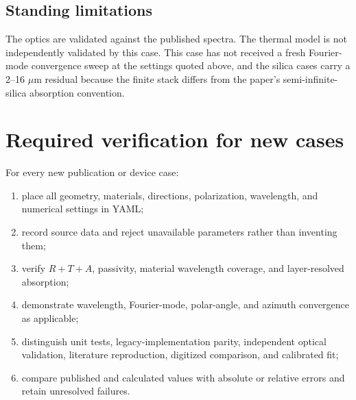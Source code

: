 \documentclass[11pt,a4paper,twoside]{article}
\begin{document}
\subsection{Standing limitations}

The optics are validated against the published spectra. The thermal model is
not independently validated by this case. This case has not received a fresh
Fourier-mode convergence sweep at the settings quoted above, and the silica
cases carry a 2--16 \(\mu\)m residual because the finite stack differs from the
paper's semi-infinite-silica absorption convention.

\section{Required verification for new cases}

For every new publication or device case:

\begin{enumerate}
  \item place all geometry, materials, directions, polarization, wavelength,
        and numerical settings in YAML;
  \item record source data and reject unavailable parameters rather than
        inventing them;
  \item verify \(R+T+A\), passivity, material wavelength coverage, and
        layer-resolved absorption;
  \item demonstrate wavelength, Fourier-mode, polar-angle, and azimuth
        convergence as applicable;
  \item distinguish unit tests, legacy-implementation parity, independent
        optical validation, literature reproduction, digitized comparison,
        and calibrated fit;
  \item compare published and calculated values with absolute or relative
        errors and retain unresolved failures.
\end{enumerate}
\end{document}
